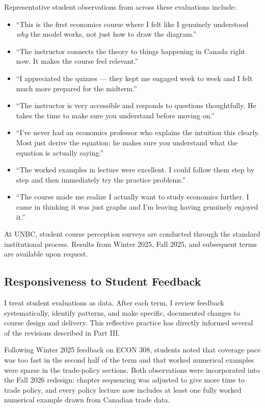 \documentclass[11pt,letterpaper]{article}
\begin{document}
Representative student observations from across these evaluations include:

\begin{itemize}
  \item ``This is the first economics course where I felt like I genuinely understood \textit{why} the model works, not just how to draw the diagram.''
  \item ``The instructor connects the theory to things happening in Canada right now. It makes the course feel relevant.''
  \item ``I appreciated the quizzes --- they kept me engaged week to week and I felt much more prepared for the midterm.''
  \item ``The instructor is very accessible and responds to questions thoughtfully. He takes the time to make sure you understand before moving on.''
  \item ``I've never had an economics professor who explains the intuition this clearly. Most just derive the equation; he makes sure you understand what the equation is actually saying.''
  \item ``The worked examples in lecture were excellent. I could follow them step by step and then immediately try the practice problems.''
  \item ``The course made me realize I actually want to study economics further. I came in thinking it was just graphs and I'm leaving having genuinely enjoyed it.''
\end{itemize}

At UNBC, student course perception surveys are conducted through the standard institutional process. Results from Winter 2025, Fall 2025, and subsequent terms are available upon request.

\subsection{Responsiveness to Student Feedback}

I treat student evaluations as data. After each term, I review feedback systematically, identify patterns, and make specific, documented changes to course design and delivery. This reflective practice has directly informed several of the revisions described in Part III.

Following Winter 2025 feedback on ECON 308, students noted that coverage pace was too fast in the second half of the term and that worked numerical examples were sparse in the trade-policy sections. Both observations were incorporated into the Fall 2026 redesign: chapter sequencing was adjusted to give more time to trade policy, and every policy lecture now includes at least one fully worked numerical example drawn from Canadian trade data.
\end{document}
